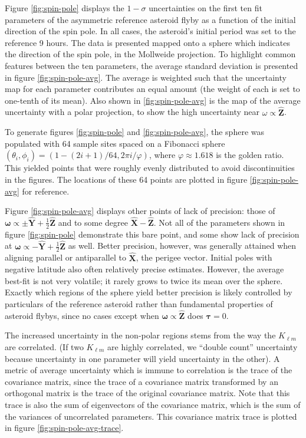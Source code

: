 \documentclass{aastex631}
\newcommand{\unit}[1]{\hat{\bm{#1}}}
\begin{document}
Figure \ref{fig:spin-pole} displays the $1-\sigma$ uncertainties on the first ten fit parameters of the asymmetric reference asteroid flyby as a function of the initial direction of the spin pole. In all cases, the asteroid's initial period was set to the reference 9 hours. The data is presented mapped onto a sphere which indicates the direction of the spin pole, in the Mollweide projection. To highlight common features between the ten parameters, the average standard deviation is presented in figure \ref{fig:spin-pole-avg}. The average is weighted such that the uncertainty map for each parameter contributes an equal amount (the weight of each is set to one-tenth of its mean). Also shown in \ref{fig:spin-pole-avg} is the map of the average uncertainty with a polar projection, to show the high uncertainty near $\omega \propto \unit Z$.

To generate figures \ref{fig:spin-pole} and \ref{fig:spin-pole-avg}, the sphere was populated with 64 sample sites spaced on a Fibonacci sphere $(\theta_i, \phi_i) = (1-(2i + 1) / 64, 2\pi  i/\varphi)$, where $\varphi\approx 1.618$ is the golden ratio. This yielded points that were roughly evenly distributed to avoid discontinuities in the figures. The locations of these 64 points are plotted in figure \ref{fig:spin-pole-avg} for reference.

Figure \ref{fig:spin-pole-avg} displays other points of lack of precision: those of $\bm \omega \propto \pm \unit Y+ \frac{1}{2}\unit Z$ and to some degree $\unit X - \unit Z$. Not all of the parameters shown in figure \ref{fig:spin-pole} demonstrate this bare point, and some show lack of precision at $\bm \omega \propto -\unit Y+ \frac{1}{2}\unit Z$ as well. Better precision, however, was generally attained when aligning parallel or antiparallel to $\unit X$, the perigee vector. Initial poles with negative latitude also often relatively precise estimates. However, the average best-fit is not very volatile; it rarely grows to twice its mean over the sphere. Exactly which regions of the sphere yield better precision is likely controlled by particulars of the reference asteroid rather than fundamental properties of asteroid flybys, since no cases except when $\bm \omega \propto \unit Z$ does $\bm \tau = 0$.

The increased uncertainty in the non-polar regions stems from the way the $K_{\ell m}$ are correlated. (If two $K_{\ell m}$ are highly correlated, we ``double count'' uncertainty because uncertainty in one parameter will yield uncertainty in the other). A metric of average uncertainty which is immune to correlation is the trace of the covariance matrix, since the trace of a covariance matrix transformed by an orthogonal matrix is the trace of the original covariance matrix. Note that this trace is also the sum of eigenvectors of the covariance matrix, which is the sum of the variances of uncorrelated parameters. This covariance matrix trace is plotted in figure \ref{fig:spin-pole-avg-trace}.
\end{document}
